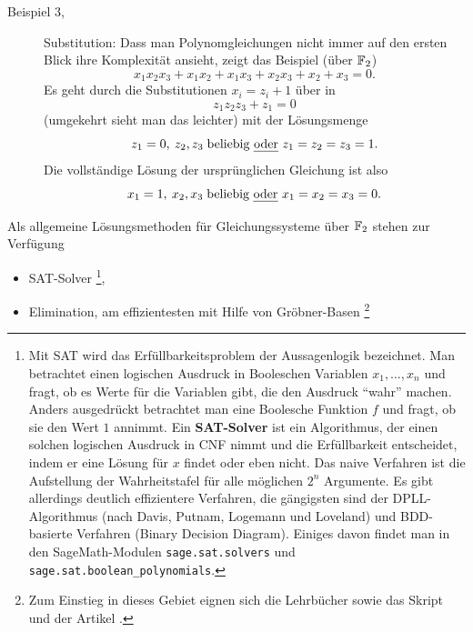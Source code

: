 \begin{refsegment}
\begin{description}
\item[Beispiel 3,] Substitution: Dass man
   Polynomgleichungen nicht immer auf den ersten
   Blick ihre Komplexität ansieht, zeigt das Beispiel (über $\mathbb{F}_2$)
\[
    x_1x_2x_3 + x_1x_2 + x_1x_3 + x_2x_3 + x_2 + x_3 = 0.
\]
   Es geht durch die Substitutionen $x_i = z_i + 1$ über in
\[
   z_1z_2z_3 + z_1 = 0
\]
   (umgekehrt sieht man das leichter) mit der Lösungsmenge
\[
   z_1 = 0,\: z_2, z_3 \;\text{beliebig {\em oder} } z_1 = z_2 = z_3 = 1.
\]
   Die vollständige Lösung der ursprünglichen Gleichung ist also
\[
   x_1 = 1,\: x_2, x_3 \;\text{beliebig {\em oder} } x_1 = x_2 = x_3 = 0.
\]
\end{description}

Als allgemeine Lösungsmethoden für Gleichungssysteme über $\mathbb{F}_2$
stehen zur Verfügung
\begin{itemize}
   \item SAT-Solver \cite{GaJo1979}\footnote{%
      Mit SAT wird das Erfüllbarkeitsproblem
      der Aussagenlogik bezeichnet.
      Man betrachtet einen logischen Ausdruck in Booleschen Variablen
      $x_1, \ldots, x_n$ und fragt, ob es Werte für die Variablen gibt,
      die den Ausdruck "`wahr"' machen. Anders ausgedrückt betrachtet
      man eine Boolesche Funktion
      $f$ und fragt, ob sie den Wert $1$ annimmt.
      Ein {\bf SAT-Solver} ist ein Algorithmus, der einen solchen logischen
      Ausdruck in
      CNF nimmt und die Erfüllbarkeit entscheidet, indem er
      eine Lösung für $x$ findet oder eben nicht. Das naive
      Verfahren ist die Aufstellung der Wahrheitstafel
      für alle möglichen $2^n$ Argumente. Es gibt allerdings deutlich
      effizientere Verfahren, die gängigsten sind der
      DPLL-Algorithmus (nach Davis, Putnam, Logemann
      und Loveland) und BDD-basierte Verfahren (Binary Decision Diagram).
      Einiges davon findet man in den SageMath-Modulen {\tt sage.sat.solvers}
      und {\tt sage.sat.boolean\_polynomials}.
      },
   \item Elimination, am effizientesten mit Hilfe von
      Gröbner-Basen \cite{Bric2010}\footnote{%
      Zum Einstieg in dieses Gebiet eignen sich die Lehrbücher
      \cite{Bard2009,CLOS2007,GaGe1999} sowie das Skript \cite{Sege2004} und der
      Artikel \cite{Laza1983}.
}
\end{itemize}
\end{refsegment}
